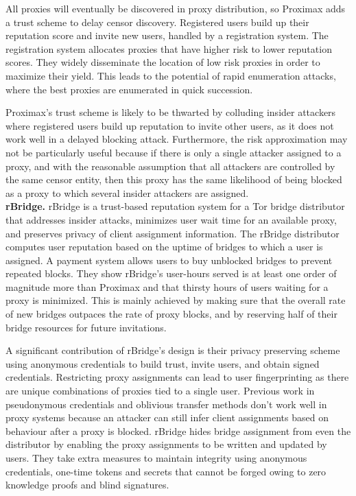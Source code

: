 All proxies will eventually be discovered in proxy distribution, so Proximax adds a trust scheme to delay censor discovery. Registered users build up their reputation score and invite new users, handled by a registration system. The registration system allocates proxies that have higher risk to lower reputation scores. They widely disseminate the location of low risk proxies in order to maximize their yield. This leads to the potential of rapid enumeration attacks, where the best proxies are enumerated in quick succession. 

Proximax's trust scheme is likely to be thwarted by colluding insider attackers where registered users build up reputation to invite other users, as it does not work well in a delayed blocking attack. Furthermore, the risk approximation may not be particularly useful because if there is only a single attacker assigned to a proxy, and with the reasonable assumption that all attackers are controlled by the same censor entity, then this proxy has the same likelihood of being blocked as a proxy to which several insider attackers are assigned. \\

\textbf{rBridge.} rBridge \cite{wang2013rbridge} is a trust-based reputation system for a Tor bridge distributor that addresses insider attacks, minimizes user wait time for an available proxy, and preserves privacy of client assignment information. The rBridge distributor computes user reputation based on the uptime of bridges to which a user is assigned. A payment system allows users to buy unblocked bridges to prevent repeated blocks. They show rBridge's user-hours served is at least one order of magnitude more than Proximax and that thirsty hours of users waiting for a proxy is minimized. This is mainly achieved by making sure that the overall rate of new bridges outpaces the rate of proxy blocks, and by reserving half of their bridge resources for future invitations.

A significant contribution of rBridge's design is their privacy preserving scheme using anonymous credentials to build trust, invite users, and obtain signed credentials. Restricting proxy assignments can lead to user fingerprinting as there are unique combinations of proxies tied to a single user. Previous work in pseudonymous credentials and oblivious transfer methods don't work well in proxy systems because an attacker can still infer client assignments based on behaviour after a proxy is blocked. rBridge hides bridge assignment from even the distributor by enabling the proxy assignments to be written and updated by users. They take extra measures to maintain integrity using anonymous credentials, one-time tokens and secrets that cannot be forged owing to zero knowledge proofs and blind signatures. 

